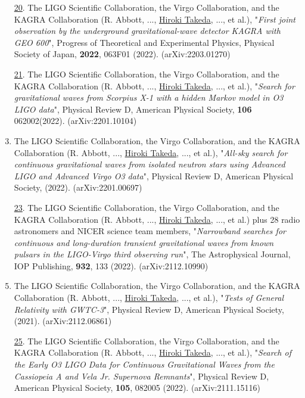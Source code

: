 \documentclass[uplatex, 12pt]{article}
\begin{document}
\begin{enumerate}
\item[\uline{20}.] The LIGO Scientific Collaboration, the Virgo Collaboration, and the KAGRA Collaboration (R. Abbott, ..., \uline{Hiroki Takeda}, ..., et al.), "\emph{First joint observation by the underground gravitational-wave detector KAGRA with GEO 600}", Progress of Theoretical and Experimental Physics, Physical Society of Japan, {\bf 2022}, 063F01 (2022). (arXiv:2203.01270)\\

\item[\uline{21}.] The LIGO Scientific Collaboration, the Virgo Collaboration, and the KAGRA Collaboration (R. Abbott, ..., \uline{Hiroki Takeda}, ..., et al.), "\emph{Search for gravitational waves from Scorpius X-1 with a hidden Markov model in O3 LIGO data}", Physical Review D, American Physical Society, {\bf 106} 062002(2022). (arXiv:2201.10104)\\

\setcounter{enumi}{21}
\item The LIGO Scientific Collaboration, the Virgo Collaboration, and the KAGRA Collaboration (R. Abbott, ..., \uline{Hiroki Takeda}, ..., et al.),
"\emph{All-sky search for continuous gravitational waves from isolated neutron stars using Advanced LIGO and Advanced Virgo O3 data}", Physical Review D, American Physical Society, (2022). (arXiv:2201.00697)\\

\item[\uline{23}.] The LIGO Scientific Collaboration, the Virgo Collaboration, and the KAGRA Collaboration (R. Abbott, ..., \uline{Hiroki Takeda}, ..., et al.) plus 28 radio astronomers and NICER science team members,
"\emph{Narrowband searches for continuous and long-duration transient gravitational waves from known pulsars in the LIGO-Virgo third observing run}", The Astrophysical Journal, IOP Publishing, {\bf 932}, 133 (2022). (arXiv:2112.10990)\\

\setcounter{enumi}{23}
\item The LIGO Scientific Collaboration, the Virgo Collaboration, and the KAGRA Collaboration (R. Abbott, ..., \uline{Hiroki Takeda}, ..., et al.), "\emph{Tests of General Relativity with GWTC-3}", Physical Review D, American Physical Society, (2021). (arXiv:2112.06861)\\

\item[\uline{25}.] The LIGO Scientific Collaboration, the Virgo Collaboration, and the KAGRA Collaboration (R. Abbott, ..., \uline{Hiroki Takeda}, ..., et al.), "\emph{Search of the Early O3 LIGO Data for Continuous Gravitational Waves from the Cassiopeia A and Vela Jr. Supernova Remnants}", Physical Review D, American Physical Society, {\bf 105}, 082005 (2022). (arXiv:2111.15116)\\


\end{enumerate}
\end{document}
